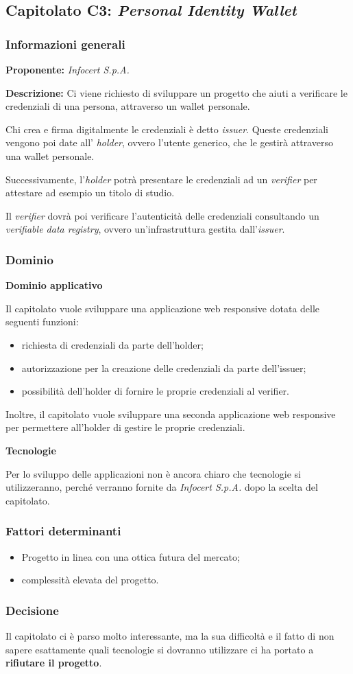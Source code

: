 \subsection{Capitolato C3: \textit{Personal Identity Wallet}}
\subsubsection{Informazioni generali}
\textbf{Proponente:} \textit{Infocert S.p.A.}

\textbf{Descrizione:} Ci viene richiesto di sviluppare un progetto che aiuti a verificare le credenziali di una persona, attraverso un wallet personale.

Chi crea e firma digitalmente le credenziali è detto \textit{issuer}. Queste credenziali vengono poi date all' \textit{holder}, ovvero l'utente generico, che le gestirà attraverso una wallet personale.

Successivamente, l'\textit{holder} potrà presentare le credenziali ad un \textit{verifier} per attestare ad esempio un titolo di studio.

Il \textit{verifier} dovrà poi verificare l'autenticità delle credenziali consultando un \textit{verifiable data registry}, ovvero un'infrastruttura gestita dall'\textit{issuer}.

\subsubsection{Dominio}
\textbf{Dominio applicativo}

Il capitolato vuole sviluppare una applicazione web responsive dotata delle seguenti funzioni:
\begin{itemize}
    \item richiesta di credenziali da parte dell'holder;
    \item autorizzazione per la creazione delle credenziali da parte dell'issuer;
    \item possibilità dell'holder di fornire le proprie credenziali al verifier.
\end{itemize}
Inoltre, il capitolato vuole sviluppare una seconda applicazione web responsive per permettere all'holder di gestire le proprie credenziali.

\textbf{Tecnologie}

Per lo sviluppo delle applicazioni non è ancora chiaro che tecnologie si utilizzeranno, perché verranno fornite da \textit{Infocert S.p.A.} dopo la scelta del capitolato.

\subsubsection{Fattori determinanti}
\begin{itemize}
    \item Progetto in linea con una ottica futura del mercato;
    \item complessità elevata del progetto.
\end{itemize}
\subsubsection{Decisione}
Il capitolato ci è parso molto interessante, ma la sua difficoltà e il fatto di non sapere esattamente quali tecnologie si dovranno utilizzare ci ha portato a \textbf{rifiutare il progetto}.